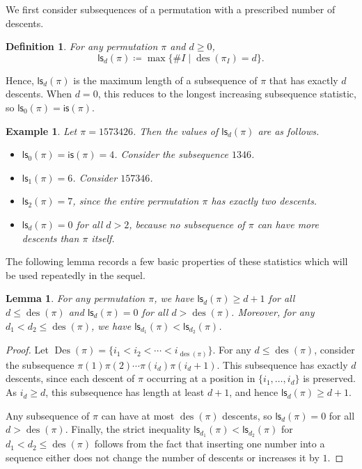 \documentclass[12pt]{article}
\newcommand{\is}{\mathsf{is}}
\newcommand{\ls}{\mathsf{ls}}
\newcommand{\des}{\operatorname{des}}
\newcommand{\Des}{\operatorname{Des}}
\newtheorem{definition}[theorem]{Definition}
\newtheorem{example}[theorem]{Example}
\newtheorem{lemma}[theorem]{Lemma}
\theoremstyle{definition}
\begin{document}
We first consider subsequences of a permutation with a prescribed number of descents.

\begin{definition}
	For any permutation $\pi$ and $d \geq 0$,
	\begin{equation*}
		\ls_d(\pi) \coloneqq \max \{\#I \mid \des(\pi_I) = d\}.
	\end{equation*}
\end{definition}

Hence, $\ls_d(\pi)$ is the maximum length of a subsequence of $\pi$ that has exactly $d$ descents. 
When $d = 0$, this reduces to the longest increasing subsequence statistic, so $\ls_0(\pi) = \is(\pi)$.


\begin{example}
	Let $\pi = 1 5 7 3 4 2 6$. Then the values of $\ls_d(\pi)$ are as follows.
	\begin{itemize}
		\item $\ls_0(\pi) = \is(\pi) = 4$. 
		Consider the subsequence $1346$.
		
		\item $\ls_1(\pi) = 6$. Consider $157346$.
		
		\item $\ls_2(\pi) = 7$, since the entire permutation $\pi$ has exactly two descents.
		
		\item $\ls_d(\pi) = 0$ for all $d > 2$, because no subsequence of $\pi$ can have more descents than $\pi$ itself.
	\end{itemize}
\end{example}

The following lemma records a few basic properties of these statistics which will be used repeatedly in the sequel.

\begin{lemma}\label{lsdnonzero}
	For any permutation $\pi$, we have $\ls_d(\pi) \geq d + 1$ for all
	$d \leq \des(\pi)$ and $\ls_d(\pi) = 0$ for all $d > \des(\pi)$. Moreover, for any $d_1 < d_2 \leq \des(\pi)$, we have $\ls_{d_1}(\pi) < \ls_{d_2}(\pi)$.
\end{lemma}

\begin{proof}
	Let $\Des(\pi) = \{i_1 < i_2 < \cdots < i_{\des(\pi)}\}$.
	For any $d \leq \des(\pi)$, consider the subsequence $\pi(1)\pi(2)\cdots\pi(i_d)\pi(i_d+1)$. 
	This subsequence has exactly $d$ descents, since each descent of $\pi$ occurring at a position in $\{i_1,\ldots,i_d\}$ is preserved.
	As $i_d \geq d$, this subsequence has length at least $d+1$, and hence
	$\ls_d(\pi) \geq d+1$.
	
	Any subsequence of $\pi$ can have at most $\des(\pi)$ descents, so
	$\ls_d(\pi) = 0$ for all $d > \des(\pi)$. 
	Finally, the strict inequality $\ls_{d_1}(\pi) < \ls_{d_2}(\pi)$ for
	$d_1 < d_2 \leq \des(\pi)$ follows from the fact that inserting one number into a sequence either does not change the number of descents or increases it by $1$.
\end{proof}
\end{document}
